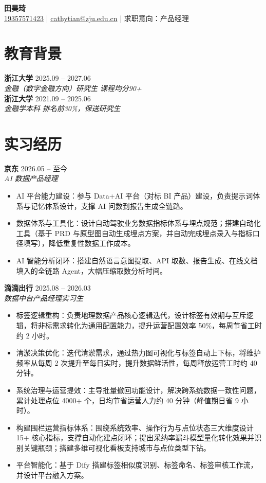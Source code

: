 \documentclass[11pt,a4paper]{article}
\newcommand{\entry}[4]{%
  \textbf{#1} \hfill #2\\
  \textit{#3} \hfill \textit{#4}\\
}
\begin{document}
{\LARGE\textbf{田昊琦}}\\[4pt]
\href{tel:19357571423}{19357571423} \;|\; \href{mailto:cathytian@zju.edu.cn}{cathytian@zju.edu.cn} \;|\; 求职意向：产品经理

\section*{教育背景}
\entry{浙江大学}{2025.09 -- 2027.06}{金融（数字金融方向）研究生}{课程均分90+}
\entry{浙江大学}{2021.09 -- 2025.06}{金融学本科}{排名前30\%，保送研究生}

\section*{实习经历}
\entry{京东}{2026.05 -- 至今}{AI 数据产品经理}{}
\begin{itemize}
  \item AI 平台能力建设：参与 Data+AI 平台（对标 BI 产品）建设，负责提示词体系与记忆体系设计，支撑 AI 问数到报告生成全链路。
  \item 数据体系与工具化：设计自动驾驶业务数据指标体系与埋点规范；搭建自动化工具（基于 PRD 与原型图自动生成埋点方案，并自动完成埋点录入与指标口径填写），降低重复性数据工作成本。
  \item AI 智能分析闭环：搭建自然语言意图提取、API 取数、报告生成、在线文档填入的全链路 Agent，大幅压缩取数分析时间。
\end{itemize}

\entry{滴滴出行}{2025.08 -- 2026.03}{数据中台产品经理实习生}{}
\begin{itemize}
  \item 标签逻辑重构：负责地理数据产品核心逻辑迭代，设计标签有效期与互斥逻辑，将非标需求转化为通用配置能力，提升运营配置效率 50\%，每周节省工时约 2 小时。
  \item 清淤决策优化：迭代清淤需求，通过热力图可视化与标签自动上下标，将维护频率从每周 2 次提升至每日实时，提升数据鲜活性，每周释放运营工时约 40 分钟。
  \item 系统治理与运营提效：主导批量撤回功能设计，解决跨系统数据一致性问题，累计处理点位 4000+ 个，日均节省运营人力约 40 分钟（峰值期日省 9 小时）。
  \item 构建围栏运营指标体系：围绕系统效率、操作行为与点位状态三大维度设计 15+ 核心指标，支撑自动化建点闭环；提出采纳率漏斗模型量化转化效果并识别关键瓶颈；搭建多维可视化看板支持城市与点位类型下钻。
  \item 平台智能化：基于 Dify 搭建标签相似度识别、标签命名、标签审核工作流，并设计平台融入方案。
\end{itemize}
\end{document}
